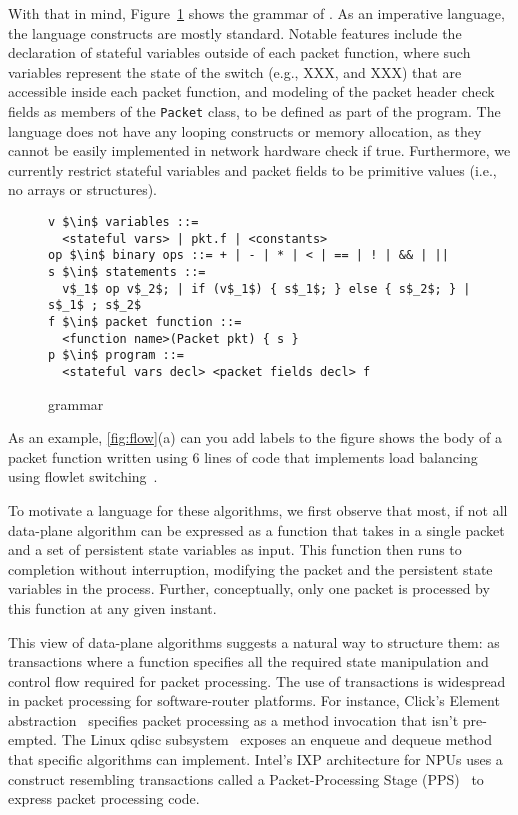 With that in mind, Figure~\ref{fig:language} shows the grammar of \pktlanguage.
As an imperative language, the language constructs are mostly standard.
Notable features include the declaration of stateful variables outside of each
packet function, where such variables represent the state of the switch 
(e.g., XXX, and XXX) that are accessible inside each packet function, and 
modeling of the packet header \ac{check} fields as members of the {\tt Packet} class,
to be defined as part of the program.
The language does not have any looping constructs or memory allocation, 
as they cannot be easily implemented
in network hardware \ac{check if true}. Furthermore,
we currently restrict stateful variables and packet fields to be primitive
values (i.e., no arrays or structures).

\begin{figure}
\begin{small}
\begin{lstlisting}
v $\in$ variables ::=
  <stateful vars> | pkt.f | <constants>
op $\in$ binary ops ::= + | - | * | < | == | ! | && | || 
s $\in$ statements ::= 
  v$_1$ op v$_2$; | if (v$_1$) { s$_1$; } else { s$_2$; } | s$_1$ ; s$_2$ 
f $\in$ packet function ::= 
  <function name>(Packet pkt) { s }
p $\in$ program ::=
  <stateful vars decl> <packet fields decl> f
\end{lstlisting}
\end{small}
\label{fig:language}
\caption{\pktlanguage grammar}
\end{figure}


As an example, \ref{fig:flow}(a) \ac{can you add labels to the figure} shows
the body of a packet function written using 6 lines of \pktlanguage code
that implements load balancing using flowlet
switching~\cite{flowlets}.



To motivate a language for these algorithms, we first observe that most, if not all
data-plane algorithm can be expressed as a function that takes in a single
packet and a set of persistent state variables as input. This function then
runs to completion without interruption, modifying the packet and the
persistent state variables in the process. Further, conceptually, only one
packet is processed by this function at any given instant.

This view of data-plane algorithms suggests a natural way to structure them: as
transactions where a function specifies all the required state manipulation and
control flow required for packet processing. The use of transactions is
widespread in packet processing for software-router platforms. For instance,
Click's Element abstraction~\cite{click} specifies packet processing as
a method invocation that isn't pre-empted.  The Linux qdisc
subsystem~\cite{qdisc} exposes an enqueue and dequeue method that specific
algorithms can implement. Intel's IXP architecture for NPUs uses a construct
resembling transactions called a Packet-Processing Stage
(PPS)~\cite{npu} to express packet processing code.

